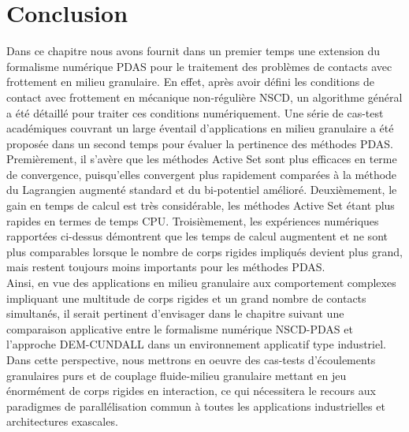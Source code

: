 \newpage

\section*{Conclusion}

Dans ce chapitre nous avons fournit dans un premier temps une extension du formalisme numérique PDAS pour le traitement des problèmes de contacts avec frottement en milieu granulaire. En effet, après avoir défini les conditions de contact avec frottement en mécanique non-régulière NSCD, un algorithme général a été détaillé pour traiter ces conditions numériquement. 
Une série de cas-test académiques couvrant un large éventail d'applications en milieu granulaire a été proposée dans un second temps pour évaluer la pertinence des méthodes PDAS.\\

\indent Premièrement, il s'avère que les méthodes Active Set sont plus efficaces en terme de convergence, puisqu'elles convergent plus rapidement comparées à la méthode du Lagrangien augmenté standard et du bi-potentiel amélioré. Deuxièmement, le gain en temps de calcul est très considérable, les méthodes Active Set étant plus rapides en termes de temps CPU. Troisièmement, les expériences numériques rapportées ci-dessus démontrent que les temps de calcul augmentent et ne sont plus comparables lorsque le nombre de corps rigides impliqués devient plus grand, mais restent toujours moins importants pour les méthodes PDAS.\\

\indent Ainsi, en vue des applications en milieu granulaire aux comportement complexes impliquant une multitude de corps rigides et un grand nombre de contacts simultanés, il serait pertinent d'envisager dans le chapitre suivant une comparaison applicative entre le formalisme numérique NSCD-PDAS et l'approche DEM-CUNDALL dans un environnement applicatif type industriel. Dans cette perspective, nous mettrons en oeuvre des cas-tests d'écoulements granulaires purs et de couplage fluide-milieu granulaire mettant en jeu énormément de corps rigides en interaction, ce qui nécessitera le recours aux paradigmes de parallélisation commun à toutes les applications industrielles et architectures exascales.